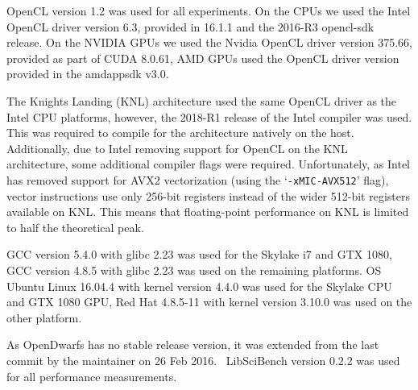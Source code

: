 \documentclass[../document.tex]{subfiles}
\begin{document}
\label{ssec:software}

OpenCL version 1.2 was used for all experiments.
On the CPUs we used the Intel OpenCL driver version 6.3, provided in 16.1.1 and the 2016-R3 opencl-sdk release.
On the NVIDIA GPUs we used the Nvidia OpenCL driver version 375.66, provided as part of CUDA 8.0.61, AMD GPUs used the OpenCL driver version provided in the amdappsdk v3.0.

The Knights Landing (KNL) architecture used the same OpenCL driver as the Intel CPU platforms, however, the 2018-R1 release of the Intel compiler was used.
This was required to compile for the architecture natively on the host.
Additionally, due to Intel removing support for OpenCL on the KNL architecture, some additional compiler flags were required.
Unfortunately, as Intel has removed support for AVX2 vectorization (using the `{\tt -xMIC-AVX512}' flag), vector instructions use only 256-bit registers instead of the wider 512-bit registers available on KNL.
This means that floating-point performance on KNL is limited to half the theoretical peak.

GCC version 5.4.0 with glibc 2.23 was used for the Skylake i7 and GTX 1080,  
GCC version 4.8.5 with glibc 2.23 was used on the remaining platforms.
OS Ubuntu Linux 16.04.4 with kernel version 4.4.0 was used for the Skylake CPU and GTX 1080 GPU, Red Hat 4.8.5-11 with kernel version 3.10.0 was used on the other platform.

As OpenDwarfs has no stable release version, it was extended from the last commit by the maintainer on 26 Feb 2016.~\cite{opendwarfs2017base}
LibSciBench version 0.2.2 was used for all performance measurements.
\end{document}
